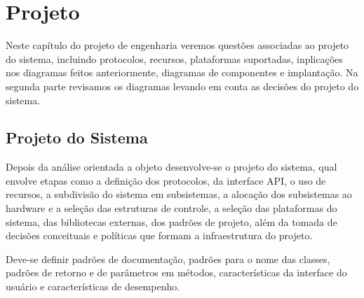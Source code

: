 
\chapter{Projeto \label{chap:Projeto-do-Sistema}}


Neste capítulo do projeto de engenharia veremos questões associadas
ao projeto do sistema, incluindo protocolos, recursos, plataformas
suportadas, inplicações nos diagramas feitos anteriormente, diagramas
de componentes e implantação. Na segunda parte revisamos os diagramas
levando em conta as decisões do projeto do sistema.

\section{Projeto do Sistema\label{sec:Projeto-do-sistema}}

Depois da análise orientada a objeto desenvolve-se o projeto do sistema,
qual envolve etapas como a definição dos protocolos, da interface
API, o uso de recursos, a subdivisão do sistema em subsistemas, a
alocação dos subsistemas ao hardware e a seleção das estruturas de
controle, a seleção das plataformas do sistema, das bibliotecas externas,
dos padrões de projeto, além da tomada de decisões conceituais e políticas
que formam a infraestrutura do projeto.

Deve-se definir padrões de documentação, padrões para o nome das classes,
padrões de retorno e de parâmetros em métodos, características da
interface do usuário e características de desempenho. 

